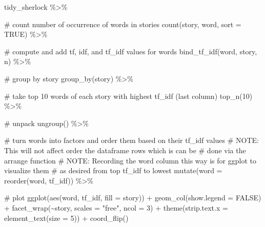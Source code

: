 \documentclass[
  letterpaper,
  DIV=11,
  numbers=noendperiod]{scrreprt}
\newenvironment{Shaded}{\begin{snugshade}}{\end{snugshade}}
\newcommand{\AlertTok}[1]{\textcolor[rgb]{0.68,0.00,0.00}{#1}}
\newcommand{\AttributeTok}[1]{\textcolor[rgb]{0.40,0.45,0.13}{#1}}
\newcommand{\CommentTok}[1]{\textcolor[rgb]{0.37,0.37,0.37}{#1}}
\newcommand{\ConstantTok}[1]{\textcolor[rgb]{0.56,0.35,0.01}{#1}}
\newcommand{\DecValTok}[1]{\textcolor[rgb]{0.68,0.00,0.00}{#1}}
\newcommand{\FunctionTok}[1]{\textcolor[rgb]{0.28,0.35,0.67}{#1}}
\newcommand{\NormalTok}[1]{\textcolor[rgb]{0.00,0.23,0.31}{#1}}
\newcommand{\SpecialCharTok}[1]{\textcolor[rgb]{0.37,0.37,0.37}{#1}}
\newcommand{\StringTok}[1]{\textcolor[rgb]{0.13,0.47,0.30}{#1}}
\begin{document}
\begin{Shaded}
\begin{Highlighting}[]
\NormalTok{tidy\_sherlock }\SpecialCharTok{\%\textgreater{}\%} 
  
  \CommentTok{\# count number of occurrence of words in stories}
  \FunctionTok{count}\NormalTok{(story, word, }\AttributeTok{sort =} \ConstantTok{TRUE}\NormalTok{) }\SpecialCharTok{\%\textgreater{}\%} 
  
  \CommentTok{\# compute and add tf, idf, and tf\_idf values for words}
  \FunctionTok{bind\_tf\_idf}\NormalTok{(word, story, n) }\SpecialCharTok{\%\textgreater{}\%} 
  
  \CommentTok{\# group by story}
  \FunctionTok{group\_by}\NormalTok{(story) }\SpecialCharTok{\%\textgreater{}\%} 
  
  \CommentTok{\# take top 10 words of each story with highest tf\_idf (last column)}
  \FunctionTok{top\_n}\NormalTok{(}\DecValTok{10}\NormalTok{) }\SpecialCharTok{\%\textgreater{}\%} 
  
  \CommentTok{\# unpack}
  \FunctionTok{ungroup}\NormalTok{() }\SpecialCharTok{\%\textgreater{}\%} 
  
  \CommentTok{\# turn words into factors and order them based on their tf\_idf values}
  \CommentTok{\# }\AlertTok{NOTE}\CommentTok{: This will not affect order the dataframe rows which is can be}
  \CommentTok{\#   done via the arrange function}
  \CommentTok{\# }\AlertTok{NOTE}\CommentTok{: Recording the word column this way is for ggplot to visualize them}
  \CommentTok{\#   as desired from top tf\_idf to lowest}
  \FunctionTok{mutate}\NormalTok{(}\AttributeTok{word =} \FunctionTok{reorder}\NormalTok{(word, tf\_idf)) }\SpecialCharTok{\%\textgreater{}\%} 
  
  \CommentTok{\# plot}
  \FunctionTok{ggplot}\NormalTok{(}\FunctionTok{aes}\NormalTok{(word, tf\_idf, }\AttributeTok{fill =}\NormalTok{ story)) }\SpecialCharTok{+}
  \FunctionTok{geom\_col}\NormalTok{(}\AttributeTok{show.legend =} \ConstantTok{FALSE}\NormalTok{) }\SpecialCharTok{+}
  \FunctionTok{facet\_wrap}\NormalTok{(}\SpecialCharTok{\textasciitilde{}}\NormalTok{story, }\AttributeTok{scales =} \StringTok{"free"}\NormalTok{, }\AttributeTok{ncol =} \DecValTok{3}\NormalTok{) }\SpecialCharTok{+}
  \FunctionTok{theme}\NormalTok{(}\AttributeTok{strip.text.x =} \FunctionTok{element\_text}\NormalTok{(}\AttributeTok{size =} \DecValTok{5}\NormalTok{)) }\SpecialCharTok{+}
  \FunctionTok{coord\_flip}\NormalTok{()}
\end{Highlighting}
\end{Shaded}
\end{document}
